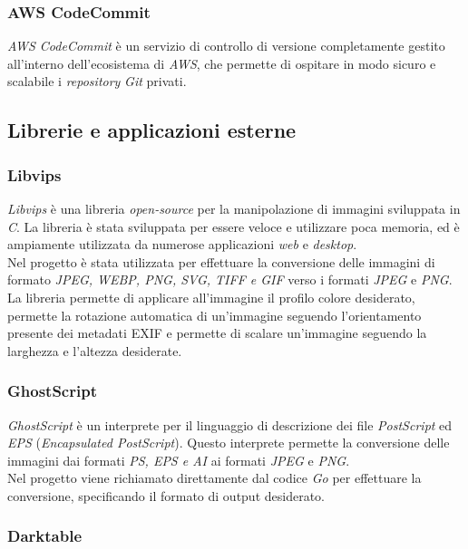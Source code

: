 \subsubsection*{AWS CodeCommit}

\emph{AWS CodeCommit} è un servizio di controllo di versione completamente
gestito all'interno dell'ecosistema di \emph{AWS}, che permette di ospitare in modo sicuro e scalabile i \emph{repository}
\emph{Git} privati. \\

\subsection{Librerie e applicazioni esterne}

\subsubsection*{Libvips}

\emph{Libvips} è una libreria \emph{open-source} per la manipolazione di immagini
sviluppata in \emph{C}. La libreria è stata sviluppata per essere veloce e
utilizzare poca memoria, ed è ampiamente utilizzata da numerose applicazioni
\emph{web} e \emph{desktop}. \\
Nel progetto è stata utilizzata per effettuare la conversione delle immagini
di formato \emph{JPEG, WEBP, PNG, SVG, TIFF e GIF} verso i formati \emph{JPEG} e
\emph{PNG}. La libreria permette di applicare all'immagine il profilo colore
desiderato, permette la rotazione automatica di un'immagine seguendo
l'orientamento presente dei \glsfirstoccur\gls{metadati}
\glsfirstoccur\gls{EXIF} e permette di scalare un'immagine seguendo la larghezza
e l'altezza desiderate. \cite{libvips}

\subsubsection*{GhostScript}

\emph{GhostScript} è un interprete per il linguaggio di descrizione dei file
\emph{PostScript} ed \emph{EPS} (\emph{Encapsulated PostScript}).
Questo interprete permette la conversione delle immagini dai formati \emph{PS,
      EPS e AI} ai formati \emph{JPEG} e
\emph{PNG}. \\
Nel progetto viene richiamato direttamente dal codice \emph{Go} per effettuare
la conversione, specificando il formato di output desiderato. \cite{ghostscript}

\subsubsection*{Darktable}

